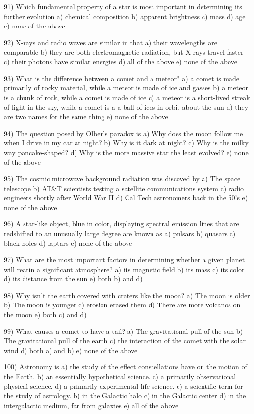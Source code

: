 91) Which fundamental property of a star is most important in determining
its further evolution
a) chemical composition b) apparent brightness
c) mass d) age e) none of the above

92) X-rays and radio waves are similar in that
a) their wavelengths are comparable
b) they are both electromagnetic radiation, but X-rays travel faster
c) their photons have similar energies
d) all of the above
e) none of the above

93) What is the difference between a comet and a meteor?
a) a comet is made primarily of rocky material, while a meteor
is made of ice and gasses
b) a meteor is a chunk of rock, while a comet is made of ice
c) a meteor is a short-lived streak of light in the sky, while
a comet is a a ball of ices in orbit about the sun
d) they are two names for the same thing
e) none of the above

94) The question posed by Olber's paradox is
a) Why does the moon follow me when I drive in my car at night?
b) Why is it dark at night?
c) Why is the milky way pancake-shaped?
d) Why is the more massive star the least evolved?
e) none of the above

95) The cosmic microwave background radiation was discoved by
a) The space telescope
b) AT&T scientists testing a satellite communications system
c) radio engineers shortly after World War II
d) Cal Tech astronomers back in the 50's
e) none of the above

96) A star-like object, blue in color, displaying spectral emission lines
that are redshifted to an unusually large degree are known as
a) pulsars b) quasars c) black holes d) laptars e) none of the above

97) What are the most important factors in determining whether a given planet
will reatin a significant atmosphere?
a) its magnetic field
b) its mass
c) its color
d) its distance from the sun
e) both b) and d)

98) Why isn't the earth covered with craters like the moon?
a) The moon is older
b) The moon is younger
c) erosion erased them
d) There are more volcanos on the moon
e) both c) and d)

99) What causes a comet to have a tail?
a) The gravitational pull of the sun
b) The gravitational pull of the earth
c) the interaction of the comet with the solar wind
d) both a) and b)
e) none of the above

100) Astronomy is
a) the study of the effect constellations have on the motion of the Earth.
b) an essentially hypothetical science.
c) a primarily observational physical science.
d) a primarily experimental life science.
e) a scientific term for the study of astrology.
b) in the Galactic halo
c) in the Galactic center
d) in the intergalactic medium, far from galaxies
e) all of the above

